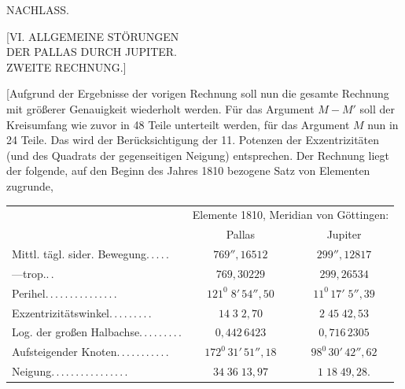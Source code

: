 \clearpage
\begin{landscape}
\begingroup
\fontsize{10}{13}\selectfont
{}
\renewcommand{\headrulewidth}{0pt}
\begin{center}
{\Large NACHLASS.}\par\bigskip
{\large [VI. ALLGEMEINE STÖRUNGEN\\DER PALLAS DURCH JUPITER.\\ZWEITE RECHNUNG.]}\par\bigskip
[1.]
\end{center}
\par\noindent\hspace*{\parindent}[Aufgrund der Ergebnisse der vorigen Rechnung soll nun die gesamte Rechnung mit größerer Genauigkeit wiederholt werden. Für das Argument \(M-M'\) soll der Kreisumfang wie zuvor in 48 Teile unterteilt werden, für das Argument \(M\) nun in 24 Teile. Das wird der Berücksichtigung der 11. Potenzen der Exzentrizitäten (und des Quadrats der gegenseitigen Neigung) entsprechen. Der Rechnung liegt der folgende, auf den Beginn des Jahres 1810 bezogene Satz von Elementen zugrunde,
\begingroup
\small\setlength{\tabcolsep}{8pt}\renewcommand{\arraystretch}{1.2}
\begin{center}
\begin{tabular}{@{}lcc@{}}
&\multicolumn{2}{c}{Elemente 1810, Meridian von Göttingen:}\\
&Pallas&Jupiter\\
Mittl. tägl. sider. Bewegung\enspace .\,.\,.\,.\,.&\(769''{,}16512\)&\(299''{,}12817\)\\
\hspace*{2em}---\hfill trop.\enspace .\,.&\(769{,}30229\)&\(299{,}26534\)\\
Perihel\enspace .\,.\,.\,.\,.\,.\,.\,.\,.\,.\,.\,.\,.\,.\,.&\(121^0\;8'\,54''{,}50\)&\(11^0\,17'\;5''{,}39\)\\
Exzentrizitätswinkel\enspace .\,.\,.\,.\,.\,.\,.\,.\,.&\(14\;3\;2{,}70\)&\(2\;45\;42{,}53\)\\
Log. der großen Halbachse\enspace .\,.\,.\,.\,.\,.\,.\,.\,.&\(0{,}442\,6423\)&\(0{,}716\,2305\)\\
Aufsteigender Knoten\enspace .\,.\,.\,.\,.\,.\,.\,.\,.\,.\,.&\(172^0\,31'\,51''{,}18\)&\(98^0\,30'\,42''{,}62\)\\
Neigung\enspace .\,.\,.\,.\,.\,.\,.\,.\,.\,.\,.\,.\,.\,.\,.\,.&\(34\;36\;13{,}97\)&\(1\;18\;49{,}28.\)

\end{tabular}
\end{center}
\end{landscape}
